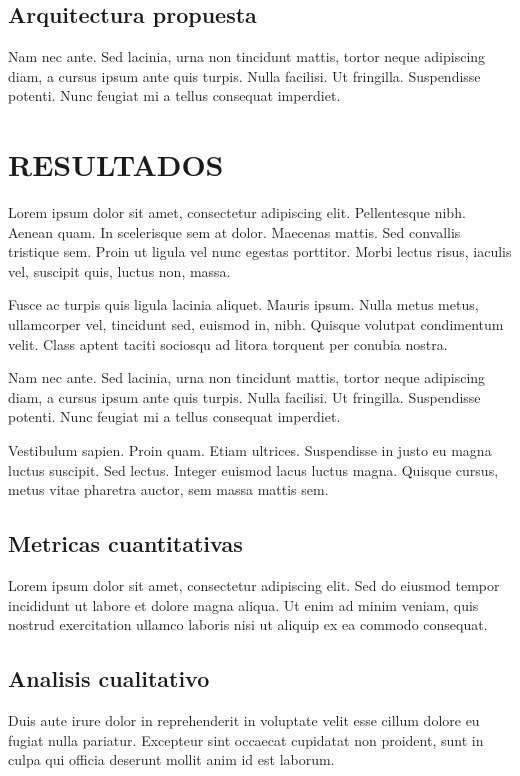 \documentclass[esp]{cesvi-class}
\begin{document}
\subsection{Arquitectura propuesta}
Nam nec ante. Sed lacinia, urna non tincidunt mattis, tortor neque adipiscing diam, a cursus ipsum ante quis turpis. Nulla facilisi. Ut fringilla. Suspendisse potenti. Nunc feugiat mi a tellus consequat imperdiet.

\section{RESULTADOS}
Lorem ipsum dolor sit amet, consectetur adipiscing elit. Pellentesque nibh. Aenean quam. In scelerisque sem at dolor. Maecenas mattis. Sed convallis tristique sem. Proin ut ligula vel nunc egestas porttitor. Morbi lectus risus, iaculis vel, suscipit quis, luctus non, massa.

Fusce ac turpis quis ligula lacinia aliquet. Mauris ipsum. Nulla metus metus, ullamcorper vel, tincidunt sed, euismod in, nibh. Quisque volutpat condimentum velit. Class aptent taciti sociosqu ad litora torquent per conubia nostra.

Nam nec ante. Sed lacinia, urna non tincidunt mattis, tortor neque adipiscing diam, a cursus ipsum ante quis turpis. Nulla facilisi. Ut fringilla. Suspendisse potenti. Nunc feugiat mi a tellus consequat imperdiet.

Vestibulum sapien. Proin quam. Etiam ultrices. Suspendisse in justo eu magna luctus suscipit. Sed lectus. Integer euismod lacus luctus magna. Quisque cursus, metus vitae pharetra auctor, sem massa mattis sem.

\subsection{Metricas cuantitativas}
Lorem ipsum dolor sit amet, consectetur adipiscing elit. Sed do eiusmod tempor incididunt ut labore et dolore magna aliqua. Ut enim ad minim veniam, quis nostrud exercitation ullamco laboris nisi ut aliquip ex ea commodo consequat.

\subsection{Analisis cualitativo}
Duis aute irure dolor in reprehenderit in voluptate velit esse cillum dolore eu fugiat nulla pariatur. Excepteur sint occaecat cupidatat non proident, sunt in culpa qui officia deserunt mollit anim id est laborum.
\end{document}
